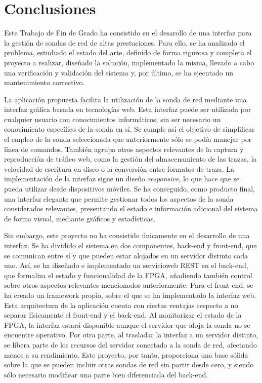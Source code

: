 \chapter{Conclusiones\label{cap:conclusiones}}

Este Trabajo de Fin de Grado ha consistido en el desarollo de una interfaz para la gestión de sondas de red de altas prestaciones.
Para ello, se ha analizado el problema, estudiado el estado del arte, definido de forma rigurosa y completa el proyecto a realizar, diseñado la solución, implementado la misma, llevado a cabo una verificación y validación del sistema y, por último, se ha ejecutado un mantenimiento correctivo.

La aplicación propuesta facilita la utilización de la sonda de red mediante una interfaz gráfica basada en tecnologías web.
Esta interfaz puede ser utilizada por cualquier usuario con conocimientos informáticos, sin ser necesario un conocimiento específico de la sonda en sí.
Se cumple así el objetivo de simplificar el empleo de la sonda seleccionada que anteriormente sólo se podía manejar por línea de comandos.
También agrupa otros aspectos relevantes de la captura y reproducción de tráfico web, como la gestión del almacenamiento de las \glspl{traza}, la velocidad de escritura en disco o la conversión entre formatos de \gls{traza}.
La implementación de la interfaz sigue un diseño \textit{responsive}, lo que hace que se pueda utilizar desde dispositivos móviles.
Se ha conseguido, como producto final, una interfaz elegante que permite gestionar todos los aspectos de la sonda considerados relevantes, presentando el estado e información adicional del sistema de forma visual, mediante gráficos y estadísticas.

Sin embargo, este proyecto no ha consistido únicamente en el desarrollo de una interfaz.
Se ha dividido el sistema en dos componentes, \gls{back-end} y \gls{front-end}, que se comunican entre sí y que pueden estar alojados en un servidor distinto cada uno.
Así, se ha diseñado e implementado un \gls{servicioweb} \gls{REST} en el \gls{back-end}, que formaliza el estado y funcionalidad de la \gls{FPGA}, añadiendo también control sobre otros aspectos relevantes mencionados anteriormente.
Para el \gls{front-end}, se ha creado un \gls{framework} propio, sobre el que se ha implementado la interfaz web.
Esta arquitectura de la aplicación cuenta con ciertas ventajas respecto a no separar físicamente el \gls{front-end} y el \gls{back-end}.
Al monitorizar el estado de la \gls{FPGA}, la interfaz estará disponible aunque el servidor que aloja la sonda no se encuentre operativo.
Por otra parte, al trasladar la interfaz a un servidor distinto, se libera parte de los recursos del servidor conectado a la sonda de red, afectando menos a su rendimiento.
Este proyecto, por tanto, proporciona una base sólida sobre la que se pueden incluir otras sondas de red sin partir desde cero, y siendo sólo necesario modificar una parte bien diferenciada del \gls{back-end}.

